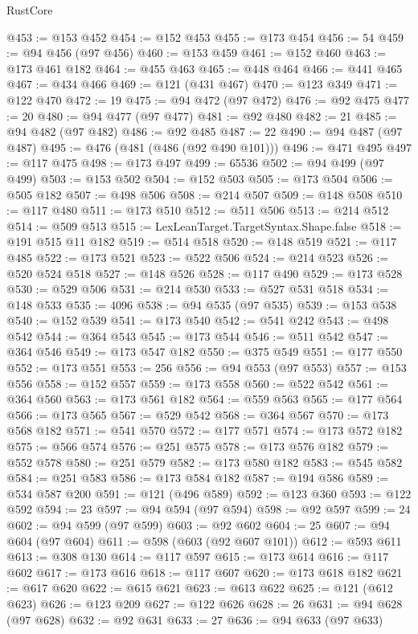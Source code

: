\begin{lexlean}{RustCore}
\begin{coremodule}
@453 := @153 @452
@454 := @152 @453
@455 := @173 @454
@456 := 54
@459 := @94 @456 (@97 @456)
@460 := @153 @459
@461 := @152 @460
@463 := @173 @461 @182
@464 := @455 @463
@465 := @448 @464
@466 := @441 @465
@467 := @434 @466
@469 := @121 (@431 @467)
@470 := @123 @349
@471 := @122 @470
@472 := 19
@475 := @94 @472 (@97 @472)
@476 := @92 @475
@477 := 20
@480 := @94 @477 (@97 @477)
@481 := @92 @480
@482 := 21
@485 := @94 @482 (@97 @482)
@486 := @92 @485
@487 := 22
@490 := @94 @487 (@97 @487)
@495 := @476 (@481 (@486 (@92 @490 @101)))
@496 := @471 @495
@497 := @117 @475
@498 := @173 @497
@499 := 65536
@502 := @94 @499 (@97 @499)
@503 := @153 @502
@504 := @152 @503
@505 := @173 @504
@506 := @505 @182
@507 := @498 @506
@508 := @214 @507
@509 := @148 @508
@510 := @117 @480
@511 := @173 @510
@512 := @511 @506
@513 := @214 @512
@514 := @509 @513
@515 := LexLeanTarget.TargetSyntax.Shape.false
@518 := @191 @515 @11 @182
@519 := @514 @518
@520 := @148 @519
@521 := @117 @485
@522 := @173 @521
@523 := @522 @506
@524 := @214 @523
@526 := @520 @524 @518
@527 := @148 @526
@528 := @117 @490
@529 := @173 @528
@530 := @529 @506
@531 := @214 @530
@533 := @527 @531 @518
@534 := @148 @533
@535 := 4096
@538 := @94 @535 (@97 @535)
@539 := @153 @538
@540 := @152 @539
@541 := @173 @540
@542 := @541 @242
@543 := @498 @542
@544 := @364 @543
@545 := @173 @544
@546 := @511 @542
@547 := @364 @546
@549 := @173 @547 @182
@550 := @375 @549
@551 := @177 @550
@552 := @173 @551
@553 := 256
@556 := @94 @553 (@97 @553)
@557 := @153 @556
@558 := @152 @557
@559 := @173 @558
@560 := @522 @542
@561 := @364 @560
@563 := @173 @561 @182
@564 := @559 @563
@565 := @177 @564
@566 := @173 @565
@567 := @529 @542
@568 := @364 @567
@570 := @173 @568 @182
@571 := @541 @570
@572 := @177 @571
@574 := @173 @572 @182
@575 := @566 @574
@576 := @251 @575
@578 := @173 @576 @182
@579 := @552 @578
@580 := @251 @579
@582 := @173 @580 @182
@583 := @545 @582
@584 := @251 @583
@586 := @173 @584 @182
@587 := @194 @586
@589 := @534 @587 @200
@591 := @121 (@496 @589)
@592 := @123 @360
@593 := @122 @592
@594 := 23
@597 := @94 @594 (@97 @594)
@598 := @92 @597
@599 := 24
@602 := @94 @599 (@97 @599)
@603 := @92 @602
@604 := 25
@607 := @94 @604 (@97 @604)
@611 := @598 (@603 (@92 @607 @101))
@612 := @593 @611
@613 := @308 @130
@614 := @117 @597
@615 := @173 @614
@616 := @117 @602
@617 := @173 @616
@618 := @117 @607
@620 := @173 @618 @182
@621 := @617 @620
@622 := @615 @621
@623 := @613 @622
@625 := @121 (@612 @623)
@626 := @123 @209
@627 := @122 @626
@628 := 26
@631 := @94 @628 (@97 @628)
@632 := @92 @631
@633 := 27
@636 := @94 @633 (@97 @633)

\end{coremodule}
\end{lexlean}
